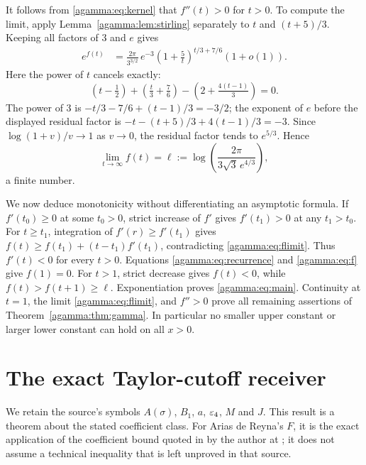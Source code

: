 \documentclass[11pt]{article}
\begin{document}
It follows from \eqref{agamma:eq:kernel} that $f''(t)>0$ for $t>0$.
To compute the limit, apply Lemma~\ref{agamma:lem:stirling} separately to
$t$ and $(t+5)/3$. Keeping all factors of $3$ and $e$ gives
\begin{align}
e^{f(t)}
&=\frac{2\pi}{3^{3/2}}\,e^{-3}
\left(1+\frac5t\right)^{t/3+7/6}(1+o(1)).\label{agamma:eq:ratio-asymptotic}
\end{align}
Here the power of $t$ cancels exactly:
\[
(t-\tfrac12)+(\tfrac t3+\tfrac76)
-\left(2+\tfrac{4(t-1)}3\right)=0.
\]
The power of $3$ is $-t/3-7/6+(t-1)/3=-3/2$; the exponent of $e$
before the displayed residual factor is
$-t-(t+5)/3+4(t-1)/3=-3$.
Since $\log(1+v)/v\to1$ as $v\to0$, the residual factor tends
to $e^{5/3}$. Hence
\begin{equation}\label{agamma:eq:flimit}
\lim_{t\to\infty}f(t)=
\ell:=\log\left(\frac{2\pi}{3\sqrt3\,e^{4/3}}\right),
\end{equation}
a finite number.

We now deduce monotonicity without differentiating an asymptotic
formula. If $f'(t_0)\ge0$ at some $t_0>0$, strict increase of $f'$
gives $f'(t_1)>0$ at any $t_1>t_0$. For $t\ge t_1$, integration
of $f'(r)\ge f'(t_1)$ gives
$f(t)\ge f(t_1)+(t-t_1)f'(t_1)$, contradicting \eqref{agamma:eq:flimit}.
Thus $f'(t)<0$ for every $t>0$. Equations \eqref{agamma:eq:recurrence}
and \eqref{agamma:eq:f} give $f(1)=0$. For $t>1$, strict decrease gives
$f(t)<0$, while $f(t)>f(t+1)\ge\ell$. Exponentiation proves
\eqref{agamma:eq:main}. Continuity at $t=1$, the limit \eqref{agamma:eq:flimit},
and $f''>0$ prove all remaining assertions of
Theorem~\ref{agamma:thm:gamma}. In particular no smaller upper constant
or larger lower constant can hold on all $x>0$.

\section{The exact Taylor-cutoff receiver}\label{agamma:sec:taylor}
We retain the source's symbols $A(\sigma)$, $B_1$, $a$,
$\varepsilon_4$, $M$ and $J$. This result is a theorem about the stated
coefficient class. For Arias de Reyna's $F$, it is the exact
application of the coefficient bound quoted in
\cite[formulas (47) and (56)]{agamma:AriasI} by the author at
\cite[\texttt{PropAprTaylor}]{agamma:AriasII}; it does not assume a
technical inequality that is left unproved in that source.
\end{document}
